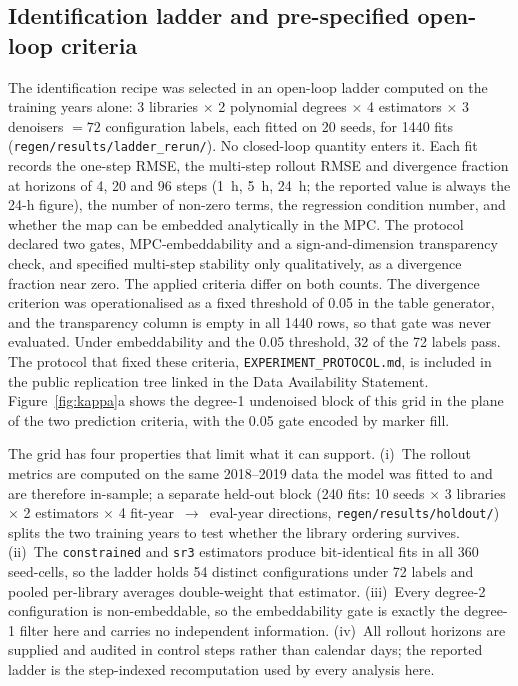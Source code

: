 \subsection{Identification ladder and pre-specified open-loop criteria}
\label{sec:ladder}

The identification recipe was selected in an open-loop ladder computed on the training
years alone: 3 libraries $\times$ 2 polynomial degrees $\times$ 4 estimators $\times$
3 denoisers $=72$ configuration labels, each fitted on 20 seeds, for 1440 fits
(\texttt{regen/results/ladder\_rerun/}). No closed-loop quantity enters it. Each fit
records the one-step RMSE, the multi-step rollout RMSE and divergence fraction at
horizons of 4, 20 and 96 steps (1~h, 5~h, 24~h; the reported value is always the 24-h
figure), the number of non-zero terms, the regression condition number, and whether the
map can be embedded analytically in the MPC. The protocol declared two gates,
MPC-embeddability and a sign-and-dimension transparency check, and specified multi-step
stability only qualitatively, as a divergence fraction near zero. The applied criteria
differ on both counts. The divergence criterion was operationalised as a fixed threshold
of 0.05 in the table generator, and the transparency column is empty in all 1440 rows,
so that gate was never evaluated. Under embeddability and the 0.05 threshold, 32 of the
72 labels pass. The protocol that
fixed these criteria, \texttt{EXPERIMENT\_PROTOCOL.md}, is included in the public
replication tree linked in the Data Availability Statement.
Figure~\ref{fig:kappa}a shows the degree-1 undenoised block of this grid in the plane of
the two prediction criteria, with the 0.05 gate encoded by marker fill.

The grid has four properties that limit what it can support. (i)~The rollout metrics are
computed on the same 2018--2019 data the model was fitted to and are therefore
in-sample; a separate held-out block (240 fits: 10 seeds $\times$ 3 libraries $\times$
2 estimators $\times$ 4 fit-year~$\rightarrow$~eval-year directions,
\texttt{regen/results/holdout/}) splits the two training years to test whether the
library ordering survives. (ii)~The \texttt{constrained} and \texttt{sr3} estimators
produce bit-identical fits in all 360 seed-cells, so the ladder holds 54 distinct
configurations under 72 labels and pooled per-library averages double-weight that
estimator. (iii)~Every degree-2 configuration is non-embeddable, so the embeddability
gate is exactly the degree-1 filter here and carries no independent information.
(iv)~All rollout horizons are supplied and audited in control steps rather than calendar
days; the reported ladder is the step-indexed recomputation used by every analysis here.

